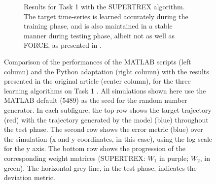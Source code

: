 \begin{figure}
\begin{subfigure}{\textwidth}
    \caption{Results for Task 1 with the SUPERTREX algorithm. The target time‐series is learned accurately during the training phase, and is also maintained in a stable manner during testing phase, albeit not as well as FORCE, as presented in \cite{pyle2019}.}
    \label{Fig:compTask1ST_MSE}
    
    \end{subfigure}


\caption{Comparison of the performances of the MATLAB scripts (left column) and the Python adaptation (right column) with the results presented in the original article (center column), for the three learning algorithms on Task 1 \cite{pyle2019}. All simulations shown here use the MATLAB default (5489) as the seed for the random number generator. In each subfigure, the top row shows the target trajectory (red) with the trajectory generated by the model (blue) throughout the test phase. The second row shows the error metric (blue) over the simulation (x and y coordinates, in this case), using the log scale for the y axis. The bottom row shows the progression of the corresponding weight matrices (SUPERTREX: $W_1$ in purple; $W_2$, in green). The horizontal grey line, in the test phase, indicates the deviation metric.}
\label{Fig:Comparison_Task1_MSE}

\end{figure}

